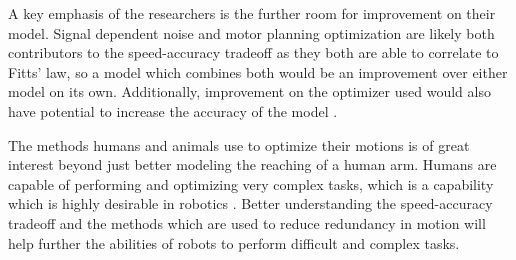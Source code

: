 \documentclass[letterpaper, 10pt, conference]{ieeeconf}
\begin{document}
A key emphasis of the researchers is the further room for improvement on their model. Signal dependent noise and motor planning optimization are likely both contributors to the speed-accuracy tradeoff as they both are able to correlate to Fitts’ law, so a model which combines both would be an improvement over either model on its own. Additionally, improvement on the optimizer used would also have potential to increase the accuracy of the model \cite{c4}.

The methods humans and animals use to optimize their motions is of great interest beyond just better modeling the reaching of a human arm. Humans are capable of performing and optimizing very complex tasks, which is a capability which is highly desirable in robotics \cite{c6}. Better understanding the speed-accuracy tradeoff and the methods which are used to reduce redundancy in motion will help further the abilities of robots to perform difficult and complex tasks.
\end{document}
